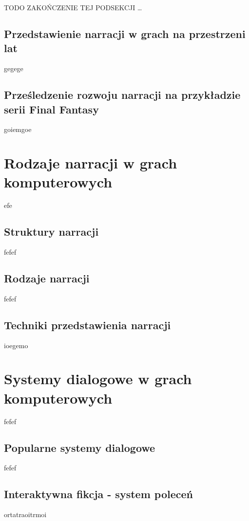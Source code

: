 TODO ZAKOŃCZENIE TEJ PODSEKCJI \ldots

\subsection{Przedstawienie narracji w grach na przestrzeni lat}\label{subsection:ch1_1_2}

gegege

\subsection{Prześledzenie rozwoju narracji na przykładzie serii Final Fantasy}\label{subsection:ch1_1_3}

goiemgoe

\section{Rodzaje narracji w grach komputerowych}\label{section:ch1_2}

efe

\subsection{Struktury narracji}\label{subsection:ch1_2_1}

fefef

\subsection{Rodzaje narracji}\label{subsection:ch1_2_2}

fefef

\subsection{Techniki przedstawienia narracji}\label{subsection:ch1_2_3}

ioegemo

\section{Systemy dialogowe w grach komputerowych}\label{section:ch1_3}

fefef

\subsection{Popularne systemy dialogowe}\label{subsection:ch1_3_1}

fefef

\subsection{Interaktywna fikcja - system poleceń}\label{subsection:ch1_3_2}

ortatraoitrmoi